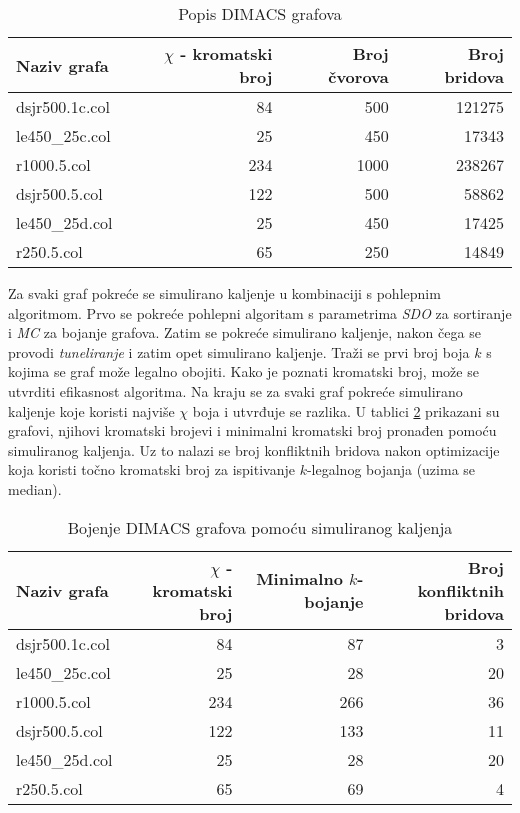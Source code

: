 \documentclass[times, utf8, diplomski, numeric]{fer}
\begin{document}
\begin{table}[htb]
	\caption{Popis DIMACS grafova}
	\label{tbl:dimacs}
	\centering
	\begin{tabular}{|l||r|r|r|} \hline
	Naziv grafa & $\chi$ - kromatski broj & Broj čvorova & Broj bridova\\ \hline \hline
	dsjr500.1c.col & 84 & 500 & 121275 \\ \hline 
	le450\_25c.col & 25 & 450 & 17343 \\  \hline
	r1000.5.col & 234 & 1000 & 238267 \\ \hline
	dsjr500.5.col & 122 & 500 & 58862 \\  \hline 
	le450\_25d.col & 25 & 450 & 17425 \\ \hline
	r250.5.col & 65 & 250 & 14849 \\ \hline
	\end{tabular}
\end{table}

Za svaki graf pokreće se simulirano kaljenje u kombinaciji s pohlepnim algoritmom. Prvo se pokreće pohlepni algoritam s parametrima \emph{SDO} za sortiranje i \emph{MC} za bojanje grafova. Zatim se pokreće simulirano kaljenje, nakon čega se provodi \emph{tuneliranje} i zatim opet simulirano kaljenje. Traži se prvi broj boja $k$ s kojima se graf može legalno obojiti. Kako je poznati kromatski broj, može se utvrditi efikasnost algoritma. Na kraju se za svaki graf pokreće simulirano kaljenje koje koristi najviše $\chi$ boja i utvrđuje se razlika. U tablici \ref{tbl:dimacs-sa} prikazani su grafovi, njihovi kromatski brojevi i minimalni kromatski broj pronađen pomoću simuliranog kaljenja. Uz to nalazi se broj konfliktnih bridova nakon optimizacije koja koristi točno kromatski broj za ispitivanje $k$-legalnog bojanja (uzima se median).

\begin{table}[htb]
	\caption{Bojenje DIMACS grafova pomoću simuliranog kaljenja}
	\label{tbl:dimacs-sa}
	\centering
	\begin{tabular}{|l||r|r|r|} \hline
	Naziv grafa & $\chi$ - kromatski broj & Minimalno $k$-bojanje & Broj konfliktnih bridova \\ \hline \hline
	dsjr500.1c.col & 84 & 87 & 3 \\ \hline 
	le450\_25c.col & 25 & 28 & 20 \\  \hline
	r1000.5.col & 234 & 266 & 36 \\ \hline
	dsjr500.5.col & 122 & 133 & 11 \\  \hline 
	le450\_25d.col & 25 & 28 & 20 \\ \hline
	r250.5.col & 65 & 69 & 4 \\ \hline
	\end{tabular}
\end{table}
\end{document}
